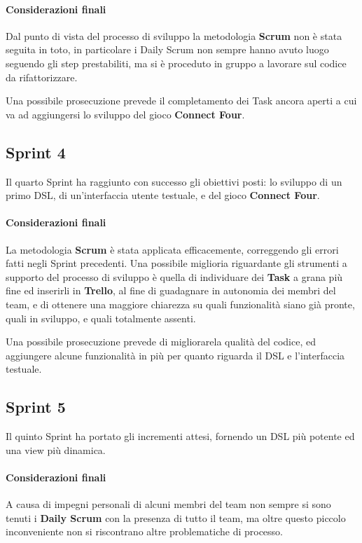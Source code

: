 \paragraph{Considerazioni finali}
Dal punto di vista del processo di sviluppo la metodologia \textbf{Scrum} non è stata seguita in toto, in particolare i Daily Scrum non sempre hanno avuto luogo seguendo gli step prestabiliti, ma si è proceduto in gruppo a lavorare sul codice da rifattorizzare.

Una possibile prosecuzione prevede il completamento dei Task ancora aperti a cui va ad aggiungersi lo sviluppo del gioco \textbf{Connect Four}.

\subsection{Sprint 4}
Il quarto Sprint ha raggiunto con successo gli obiettivi posti: lo sviluppo di un primo DSL, di un'interfaccia utente testuale, e del gioco \textbf{Connect Four}.
\paragraph{Considerazioni finali}
La metodologia \textbf{Scrum} è stata applicata efficacemente, cor\-reg\-gendo gli errori fatti negli Sprint precedenti.
%
Una possibile miglioria riguardante gli strumenti a supporto del processo di sviluppo è quella di individuare dei \textbf{Task} a grana più fine ed inserirli in \textbf{Trello}, al fine di guadagnare in autonomia dei membri del team, e di ottenere una maggiore chiarezza su quali funzionalità siano già pronte, quali in sviluppo, e quali totalmente assenti.

Una possibile prosecuzione prevede di migliorarela qualità del codice, ed aggiungere alcune funzionalità in più per quanto riguarda il DSL e l'interfaccia testuale.

\subsection{Sprint 5}
Il quinto Sprint ha portato gli incrementi attesi, fornendo un DSL più potente ed una view più dinamica.
\paragraph{Considerazioni finali}
A causa di impegni personali di alcuni membri del team non sempre si sono tenuti i \textbf{Daily Scrum} con la presenza di tutto il team, ma oltre questo piccolo inconveniente non si riscontrano altre problematiche di processo.

